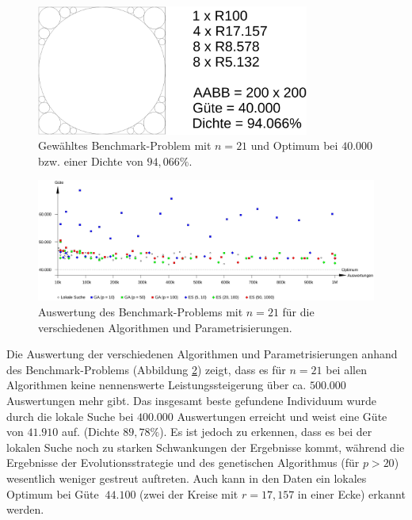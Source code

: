 \documentclass[twoside,bibtotoc]{report}
\begin{document}
\begin{figure}[h]
 \centering
 \includegraphics [width=0.8\textwidth]{Bilder/6.png}
 \caption{
 	Gewähltes Benchmark-Problem mit $n = 21$ und Optimum bei $40.000$ bzw. einer Dichte von $94,066\%$.
 	}
 \label{fig:benchmark}
\end{figure}

\begin{figure}[h]
 \centering
 \includegraphics [width=1\textwidth]{Bilder/benchmark.png}
 \caption{
 	Auswertung des Benchmark-Problems mit $n = 21$ für die verschiedenen Algorithmen und Parametrisierungen.
 	}
 \label{fig:benchmark_test}
\end{figure}

Die Auswertung der verschiedenen Algorithmen und Parametrisierungen anhand des Benchmark-Problems (Abbildung \ref{fig:benchmark_test}) zeigt, dass es für $n = 21$ bei allen Algorithmen keine nennenswerte Leistungssteigerung über ca. $500.000$ Auswertungen mehr gibt.
Das insgesamt beste gefundene Individuum wurde durch die lokale Suche bei $400.000$ Auswertungen erreicht und weist eine Güte von $41.910$ auf. (Dichte $89,78\%$).
Es ist jedoch zu erkennen, dass es bei der lokalen Suche noch zu starken Schwankungen der Ergebnisse kommt, während die Ergebnisse der Evolutionsstrategie und des genetischen Algorithmus (für $p > 20$) wesentlich weniger gestreut auftreten.
Auch kann in den Daten ein lokales Optimum bei Güte $~44.100$ (zwei der Kreise mit $r = 17,157$ in einer Ecke) erkannt werden.\\
\end{document}
